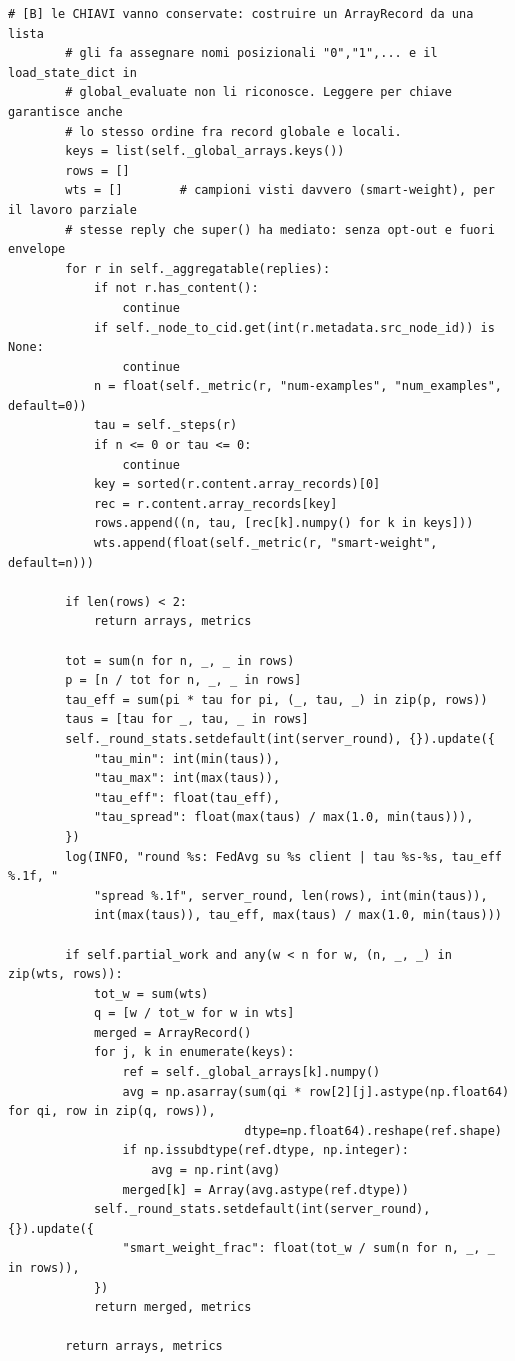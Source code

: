 \documentclass[11pt,a4paper]{article}
\begin{document}
\begin{lstlisting}[style=py,firstnumber=965,caption={\texttt{tesifl/strategies/sage\_smart.py}, lines 965--1056}]
        # [B] le CHIAVI vanno conservate: costruire un ArrayRecord da una lista
        # gli fa assegnare nomi posizionali "0","1",... e il load_state_dict in
        # global_evaluate non li riconosce. Leggere per chiave garantisce anche
        # lo stesso ordine fra record globale e locali.
        keys = list(self._global_arrays.keys())
        rows = []
        wts = []        # campioni visti davvero (smart-weight), per il lavoro parziale
        # stesse reply che super() ha mediato: senza opt-out e fuori envelope
        for r in self._aggregatable(replies):
            if not r.has_content():
                continue
            if self._node_to_cid.get(int(r.metadata.src_node_id)) is None:
                continue
            n = float(self._metric(r, "num-examples", "num_examples", default=0))
            tau = self._steps(r)
            if n <= 0 or tau <= 0:
                continue
            key = sorted(r.content.array_records)[0]
            rec = r.content.array_records[key]
            rows.append((n, tau, [rec[k].numpy() for k in keys]))
            wts.append(float(self._metric(r, "smart-weight", default=n)))

        if len(rows) < 2:
            return arrays, metrics

        tot = sum(n for n, _, _ in rows)
        p = [n / tot for n, _, _ in rows]
        tau_eff = sum(pi * tau for pi, (_, tau, _) in zip(p, rows))
        taus = [tau for _, tau, _ in rows]
        self._round_stats.setdefault(int(server_round), {}).update({
            "tau_min": int(min(taus)),
            "tau_max": int(max(taus)),
            "tau_eff": float(tau_eff),
            "tau_spread": float(max(taus) / max(1.0, min(taus))),
        })
        log(INFO, "round %s: FedAvg su %s client | tau %s-%s, tau_eff %.1f, "
            "spread %.1f", server_round, len(rows), int(min(taus)),
            int(max(taus)), tau_eff, max(taus) / max(1.0, min(taus)))

        if self.partial_work and any(w < n for w, (n, _, _) in zip(wts, rows)):
            tot_w = sum(wts)
            q = [w / tot_w for w in wts]
            merged = ArrayRecord()
            for j, k in enumerate(keys):
                ref = self._global_arrays[k].numpy()
                avg = np.asarray(sum(qi * row[2][j].astype(np.float64) for qi, row in zip(q, rows)),
                                 dtype=np.float64).reshape(ref.shape)
                if np.issubdtype(ref.dtype, np.integer):
                    avg = np.rint(avg)
                merged[k] = Array(avg.astype(ref.dtype))
            self._round_stats.setdefault(int(server_round), {}).update({
                "smart_weight_frac": float(tot_w / sum(n for n, _, _ in rows)),
            })
            return merged, metrics

        return arrays, metrics
\end{lstlisting}
\end{document}
